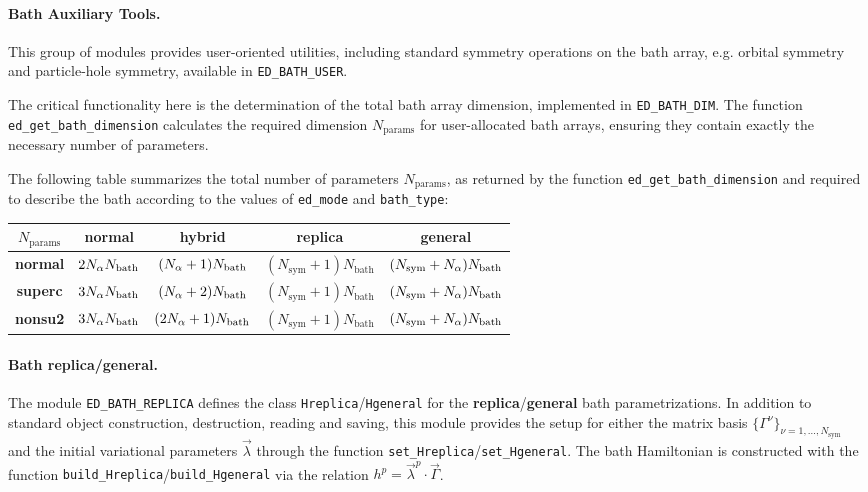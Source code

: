 \documentclass[edipack_sp.tex]{subfiles}
\begin{document}
\paragraph{Bath Auxiliary Tools.}
This group of modules provides user-oriented utilities, including 
standard symmetry operations on the bath array, e.g. orbital 
symmetry and particle-hole symmetry, available in 
{\tt ED\_BATH\_USER}. 

The critical functionality here is the 
determination of the total bath array dimension, implemented in 
{\tt ED\_BATH\_DIM}. The function {\tt ed\_get\_bath\_dimension} 
calculates the required dimension $N_\mathrm{params}$ for user-allocated bath 
arrays, ensuring they contain exactly the necessary number of 
parameters. 

The following table summarizes the total number of parameters $N_\mathrm{params}$, as returned by the function {\tt ed\_get\_bath\_dimension} and required to describe the bath according to the values of {\tt ed\_mode} and {\tt bath\_type}:

\begin{center}
\begin{tabular}{ |c||c|c|c|c| } 
 \hline     
 $N_\mathrm{params}$ & {\bf normal} & {\bf hybrid} & {\bf replica} & {\bf general}\\
 \hline 
 \hline    
 {\bf normal} & 
 $2N_\alpha N_\mathrm{bath}$ & 
 $(N_\alpha+1)N_\mathrm{bath}$ & 
 $(N_\mathrm{sym}+1)N_\mathrm{bath}$ & 
 $(N_\mathrm{sym}+N_\alpha)N_\mathrm{bath}$\\
 \hline
   {\bf superc} & $3N_\alpha N_\mathrm{bath}$ & 
 $(N_\alpha+2)N_\mathrm{bath}$ & 
 $(N_\mathrm{sym}+1)N_\mathrm{bath}$ & 
 $(N_\mathrm{sym}+N_\alpha)N_\mathrm{bath}$\\
 \hline
   {\bf nonsu2} & $3N_\alpha N_\mathrm{bath}$ & 
 $(2N_\alpha+1)N_\mathrm{bath}$ & 
 $(N_\mathrm{sym}+1)N_\mathrm{bath}$ & 
 $(N_\mathrm{sym}+N_\alpha)N_\mathrm{bath}$\\
 \hline
\end{tabular}
\end{center}

\paragraph{Bath replica/general.}
The module {\tt ED\_BATH\_REPLICA} defines the class {\tt Hreplica}/{\tt Hge\-ne\-ral} for the {\bf replica}/{\bf general} bath parametrizations. In  addition to standard object construction, destruction, reading and saving, this module provides the setup for either the matrix basis  
$\{ \Gamma^\nu \}_{\nu=1,\dots,N_\mathrm{sym}}$ and the initial variational parameters $\vec{\lambda}$ through the function  {\tt set\_Hreplica}/{\tt set\_Hge\-ne\-ral}. 
%
The bath Hamiltonian is constructed with the function 
{\tt build\_Hreplica}/{\tt build\_Hge\-ne\-ral} via the relation
$
h^p = \vec{\lambda}^p \cdot \vec{\Gamma}
$.
\end{document}
